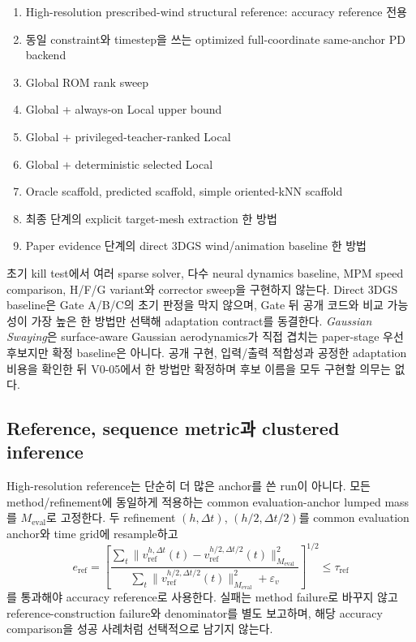 \documentclass[11pt]{article}
\begin{document}
\begin{enumerate}
  \item High-resolution prescribed-wind structural reference: accuracy reference 전용
  \item 동일 constraint와 timestep을 쓰는 optimized full-coordinate same-anchor PD backend
  \item Global ROM rank sweep
  \item Global + always-on Local upper bound
  \item Global + privileged-teacher-ranked Local
  \item Global + deterministic selected Local
  \item Oracle scaffold, predicted scaffold, simple oriented-kNN scaffold
  \item 최종 단계의 explicit target-mesh extraction 한 방법
  \item Paper evidence 단계의 direct 3DGS wind/animation baseline 한 방법
\end{enumerate}

초기 kill test에서 여러 sparse solver, 다수 neural dynamics baseline,
MPM speed comparison, H/F/G variant와 corrector sweep을 구현하지 않는다.
Direct 3DGS baseline은 Gate A/B/C의 초기 판정을 막지 않으며,
Gate 뒤 공개 코드와 비교 가능성이 가장 높은 한 방법만 선택해 adaptation contract를 동결한다.
\emph{Gaussian Swaying}은 surface-aware Gaussian aerodynamics가 직접 겹치는 paper-stage 우선
후보지만 확정 baseline은 아니다. 공개 구현, 입력/출력 적합성과 공정한 adaptation 비용을 확인한 뒤
V0-05에서 한 방법만 확정하며 후보 이름을 모두 구현할 의무는 없다.

\subsection{Reference, sequence metric과 clustered inference}

High-resolution reference는 단순히 더 많은 anchor를 쓴 run이 아니다. 모든 method/refinement에
동일하게 적용하는 common evaluation-anchor lumped mass를 \(M_{\mathrm{eval}}\)로 고정한다. 두 refinement
\((h,\Delta t)\), \((h/2,\Delta t/2)\)를 common evaluation anchor와 time grid에 resample하고
\begin{equation}
  e_{\mathrm{ref}}
  =
  \left[
  \frac{\sum_t\|v_{\mathrm{ref}}^{h,\Delta t}(t)
    -v_{\mathrm{ref}}^{h/2,\Delta t/2}(t)\|_{M_{\mathrm{eval}}}^2}
       {\sum_t\|v_{\mathrm{ref}}^{h/2,\Delta t/2}(t)\|_{M_{\mathrm{eval}}}^2+\varepsilon_v}
  \right]^{1/2}
  \leq\tau_{\mathrm{ref}}
  \label{eq:minimal-reference-convergence}
\end{equation}
를 통과해야 accuracy reference로 사용한다. 실패는 method failure로 바꾸지 않고
reference-construction failure와 denominator를 별도 보고하며, 해당 accuracy comparison을 성공 사례처럼
선택적으로 남기지 않는다.
\end{document}
